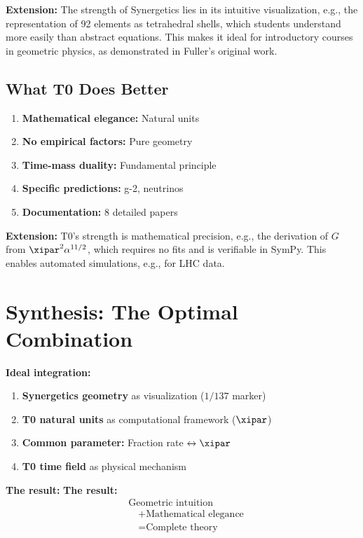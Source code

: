 	\textbf{Extension:} The strength of Synergetics lies in its intuitive visualization, e.g., the representation of 92 elements as tetrahedral shells, which students understand more easily than abstract equations. This makes it ideal for introductory courses in geometric physics, as demonstrated in Fuller's original work.
	
	\subsection{What T0 Does Better}
	
	\begin{enumerate}
		\item \textbf{Mathematical elegance:} Natural units
		\item \textbf{No empirical factors:} Pure geometry
		\item \textbf{Time-mass duality:} Fundamental principle
		\item \textbf{Specific predictions:} g-2, neutrinos
		\item \textbf{Documentation:} 8 detailed papers
	\end{enumerate}
	
	\textbf{Extension:} T0's strength is mathematical precision, e.g., the derivation of $G$ from $\xipar^2 \alpha^{11/2}$, which requires no fits and is verifiable in SymPy. This enables automated simulations, e.g., for LHC data.
	
	\section{Synthesis: The Optimal Combination}
	
	\begin{gemeinsam}
		\textbf{Ideal integration:}
		
		\begin{enumerate}
			\item \textbf{Synergetics geometry} as visualization ($1/137$ marker)
			\item \textbf{T0 natural units} as computational framework ($\xipar$)
			\item \textbf{Common parameter:} Fraction rate $\leftrightarrow \xipar$
			\item \textbf{T0 time field} as physical mechanism
		\end{enumerate}
		
		\textbf{The result:}
\textbf{The result:}
\begin{equation}
	\boxed{
		\begin{aligned}
			&\text{Geometric intuition} \\
			&\quad + \text{Mathematical elegance} \\
			&\quad = \text{Complete theory}
		\end{aligned}
	}
\end{equation}
	\end{gemeinsam}
	
